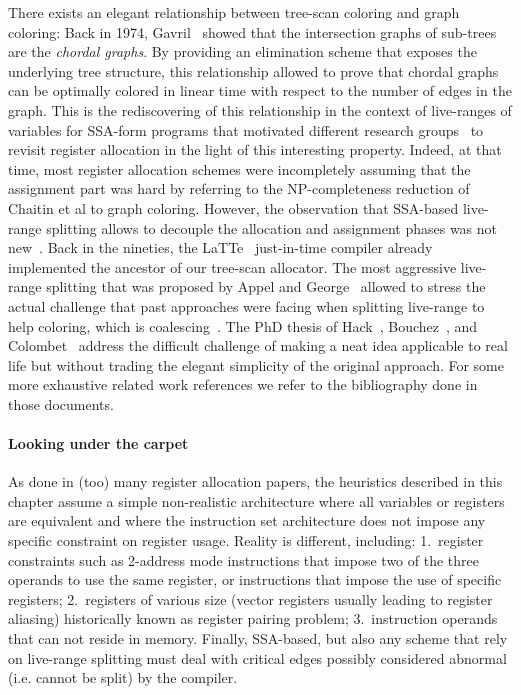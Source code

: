 {There exists an elegant relationship between tree-scan coloring and graph coloring:
Back in 1974, Gavril~\cite{Gavril:1974:JCS} showed that the intersection graphs of sub-trees are the \emph{chordal graphs}.
By providing an elimination scheme that exposes the underlying tree structure, this relationship allowed to prove that chordal graphs can be optimally colored in linear time with respect to the number of edges in the graph.
This is the rediscovering of this relationship in the context of live-ranges of variables for SSA-form programs that motivated different research groups~\cite{HGG:2005:RegisterSSA,brisk:2005:poly,pereira:2005:chordal,Bouchez06} to revisit register allocation in the light of this interesting property.
Indeed, at that time, most register allocation schemes were incompletely assuming that the assignment part was hard by referring to the NP-completeness reduction of Chaitin et al to graph coloring.
However, the observation that SSA-based live-range splitting allows to decouple the allocation and assignment phases was not new~\cite{CyFe87,Fabr79}.
Back in the nineties, the LaTTe~\cite{yang1999latte} just-in-time compiler already implemented the ancestor of our tree-scan allocator.
The most aggressive live-range splitting that was proposed by Appel and George~\cite{Appel01} allowed to stress the actual challenge that past approaches were facing when splitting live-range to help coloring, which is coalescing~\cite{BouchezDR07:coalescing-cplx}.
The PhD thesis of Hack~\cite{Hack07a}, Bouchez~\cite{bouchez-phd}, and Colombet~\cite{colombet-phd} address the difficult challenge of making a neat idea applicable to real life but without trading the elegant simplicity of the original approach.
For some more exhaustive related work references we refer to the bibliography done in those documents. 

\paragraph{Looking under the carpet}
As done in (too) many register allocation papers, the heuristics described in this chapter assume a simple non-realistic architecture where all variables or registers are equivalent and where the instruction set architecture does not impose any specific constraint on register usage. 
Reality is different, including:
1.~register constraints such as 2-address mode instructions that impose two of the three operands to use the same register, or instructions that impose the use of specific registers;
2.~registers of various size (vector registers usually leading to register aliasing) historically known as register pairing problem;
3.~instruction operands that can not reside in memory.
Finally, SSA-based, but also any scheme that rely on live-range splitting must deal with critical edges possibly considered abnormal (i.e. cannot be split) by the compiler.

}

